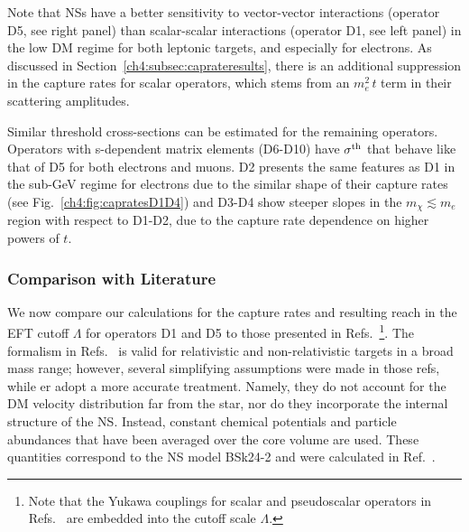 Note that NSs have a better sensitivity to vector-vector interactions (operator D5, see right panel) than scalar-scalar interactions (operator D1, see left panel) in the low DM regime for both leptonic targets, and especially for electrons. As discussed in Section~\ref{ch4:subsec:caprateresults}, there is an additional suppression in the capture rates for scalar operators, which stems from an $m_e^2 \, t$ term in their scattering amplitudes. 

Similar threshold cross-sections can be estimated for the remaining operators.  Operators with s-dependent matrix elements (D6-D10) have  $\sigma^{\rm th}$ that behave like that of D5 for both electrons and muons. D2 presents the same features as D1 in the sub-GeV regime for electrons due to the similar shape of their capture rates (see Fig.~\ref{ch4:fig:capratesD1D4}) and D3-D4 show steeper slopes in the $m_\chi\lesssim m_e$ region with respect to D1-D2, due to the capture rate dependence on higher powers of $t$. 



\subsubsection{Comparison with Literature}
\label{ch4:subsubsec:literature_comp_NS}

We now compare our calculations for the capture rates and resulting reach in the EFT cutoff $\Lambda$ for operators D1 and D5 to those presented in Refs.~\cite{Joglekar:2019vzy_sep_Relativisticcapturedark,Joglekar:2020liw_Darkkineticheating}\footnote{Note that the Yukawa couplings for scalar and pseudoscalar operators in Refs.~\cite{Joglekar:2019vzy_sep_Relativisticcapturedark,Joglekar:2020liw_Darkkineticheating} are embedded into the cutoff scale $\Lambda$.}.
The formalism in Refs.~\cite{Joglekar:2019vzy_sep_Relativisticcapturedark,Joglekar:2020liw_Darkkineticheating} is valid for relativistic and non-relativistic targets in a broad mass range; however, several simplifying assumptions were made in those refs, while er adopt a more accurate treatment. Namely, they do not account for the DM velocity distribution far from the star, nor do they incorporate the internal structure of the NS. Instead, constant chemical potentials and particle abundances that have been averaged over the core volume are used. These quantities correspond to the NS model BSk24-2 and were calculated in Ref.~\cite{Bell:2019pyc_jun_CaptureLeptophilicDark}. 



